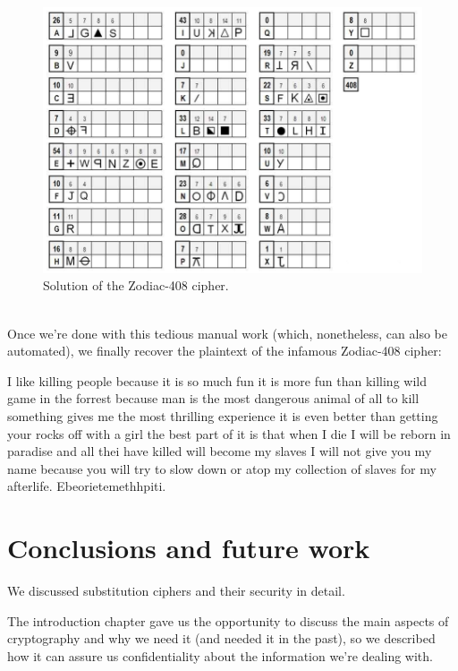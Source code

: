 \documentclass[Lau,binding=0.6cm,oneside]{sapthesis}
\begin{document}
\begin{figure}[H]
\includegraphics[scale=0.55]{zodiac_408_mapping}
\centering
\caption{Solution of the Zodiac-408 cipher.}
\centering
\end{figure}
\ \\
Once we're done with this tedious manual work (which, nonetheless, can also be automated), we finally recover the plaintext of the infamous Zodiac-408 cipher:\\
\begin{displayquote}{\small{\textsf{I like killing people because it is so much fun it is more fun than killing wild game in the forrest because man is the most dangerous animal of all to kill something gives me the most thrilling experience it is even better than getting your rocks off with a girl the best part of it is that when I die I will be reborn in paradise and all thei have killed will become my slaves I will not give you my name because you will try to slow down or atop my collection of slaves for my afterlife. Ebeorietemethhpiti.}}}
\end{displayquote}

\chapter*{Conclusions and future work}
We discussed substitution ciphers and their security in detail.

The introduction chapter gave us the opportunity to discuss the main aspects of cryptography and why we need it (and needed it in the past), so we described how it can assure us confidentiality about the information we're dealing with.
\end{document}
